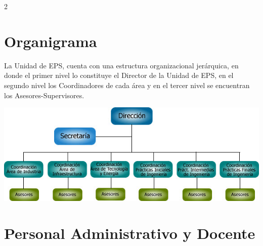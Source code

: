 \documentclass[12pt,spanish,Letterpaper,openany]{book}
\begin{document}
\begin {multicols}{2}
\hypertarget{organigrama}{%
\section*{Organigrama}\label{organigrama}}

La Unidad de EPS, cuenta con una estructura organizacional jerárquica, en donde el primer nivel lo constituye el Director de la Unidad de EPS, en el segundo nivel los Coordinadores de cada área y en el tercer nivel se encuentran los Asesores-Supervisores.
\bigskip

\begin {flushleft}

\noindent\begin{minipage}[c]{\columnwidth}

\includegraphics[width=1\linewidth]{images/201901-unidadeps-imagen01}

\end{minipage}

\end {flushleft}

\bigskip

\end {multicols}

\hypertarget{personal-administrativo-y-docente}{%
\section*{Personal Administrativo y Docente}\label{personal-administrativo-y-docente}}
\end{document}
